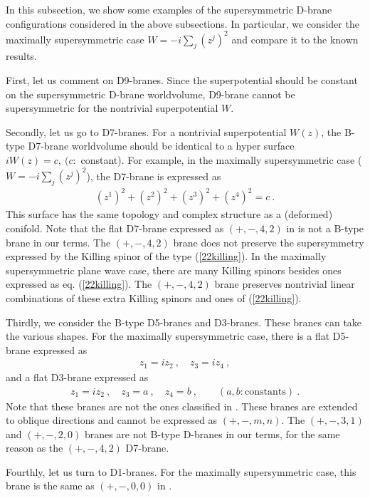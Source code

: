 \documentclass[a4paper,12pt]{article}
\numberwithin{equation}{section}
\begin{document}
In this subsection, we show some examples of the 
supersymmetric D-brane configurations
considered in the above subsections. In particular, we consider the 
maximally supersymmetric case $ W= -i \sum_{j}(z^{j})^2$ and compare it to the
known results.

First, let us comment on D9-branes. Since the superpotential should be
constant on the supersymmetric D-brane worldvolume, D9-brane cannot
be supersymmetric for the nontrivial superpotential $W$.

Secondly, let us go to D7-branes. For a nontrivial superpotential $W(z)$,
the B-type D7-brane worldvolume should be identical to a hyper surface 
$ i W(z)=c,\ (c:$ constant). For example, in the maximally supersymmetric case
($W=-i\sum_{j}(z^{j})^2$), the D7-brane is expressed as
\begin{align}
 (z^1)^2+(z^2)^2+(z^3)^2+(z^4)^2=c ~.
\end{align}
This surface has the same topology and
complex structure as a (deformed) conifold.
Note that the flat D7-brane expressed as $(+,-,4,2)$ in \cite{Skenderis:2002vf}
is not a B-type brane in our terms. The $(+,-,4,2)$ brane does not preserve
the supersymmetry expressed by the Killing spinor of the type (\ref{22killing}).
In the maximally supersymmetric plane wave case, 
there are many Killing spinors besides ones expressed as eq. (\ref{22killing}). The $(+,-,4,2)$ brane preserves
nontrivial linear combinations of these extra Killing spinors
and ones of (\ref{22killing}).

Thirdly, we consider the B-type D5-branes and D3-branes. These branes can
take the various shapes. For the maximally supersymmetric case,
there is a flat D5-brane expressed as
\begin{align}
z_1=i z_2 ~,\quad z_3=i z_4 ~,
\end{align}
and a flat D3-brane expressed as
\begin{align}
z_1=i z_2 ~,\quad z_3=a ~,\quad  z_4=b ~, \qquad(a,b:\text{constants})~.
\end{align}
Note that these branes are not the ones classified in \cite{Skenderis:2002vf}.
These branes are extended to oblique directions and cannot be expressed as
$(+,-,m,n)$. The $(+,-,3,1)$ and $(+,-,2,0)$ branes are not B-type D-branes
in our terms, for the same reason as the $(+,-,4,2)$ D7-brane.

Fourthly, let us turn to D1-branes. For the maximally supersymmetric case,
this brane is the same as $(+,-,0,0)$ in \cite{Skenderis:2002vf}.
\end{document}
